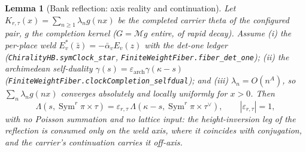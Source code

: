 \documentclass[11pt]{article}
\newtheorem{lemma}[theorem]{Lemma}
\theoremstyle{definition}
\newcommand{\Sym}{\operatorname{Sym}}
\begin{document}
\begin{lemma}[Bank reflection: axis reality and continuation]\label{lem:bankreflection}
Let $K_{r,\tau}(x)=\sum_{n\ge1}\lambda_n g(nx)$ be the completed carrier theta of the configured pair, $g$ the
completion kernel ($G=\mathcal M g$ entire, of rapid decay). Assume \emph{(i)} the per-place weld
$E_v^{*}(\bar z)=-\bar\alpha_v E_v(z)$ with the det-one ledger (\texttt{ChiralityHB.symClock\_star},
\texttt{FiniteWeightFiber.fiber\_det\_one}); \emph{(ii)} the archimedean self-duality
$\gamma(s)=\varepsilon_{\mathrm{arch}}\gamma(\kappa-s)$
(\texttt{FiniteWeightFiber.clockCompletion\_selfdual}); and \emph{(iii)} $\lambda_n=O(n^{A})$, so
$\sum_n\lambda_n g(nx)$ converges absolutely and locally uniformly for $x>0$. Then
\[
  \Lambda(s,\Sym^r\pi\times\tau)=\varepsilon_{r,\tau}\,\Lambda(\kappa-s,\Sym^r\pi\times\tau^\vee),
  \qquad|\varepsilon_{r,\tau}|=1,
\]
with \emph{no Poisson summation and no lattice input}: the height-inversion leg of the reflection is consumed
only on the weld axis, where it coincides with conjugation, and the carrier's continuation carries it off-axis.
\end{lemma}
\end{document}
